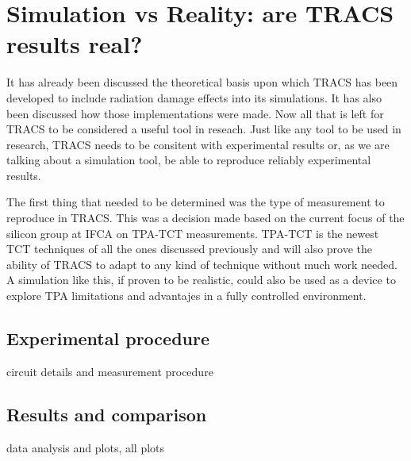 \chapter{Simulation vs Reality: are TRACS results real?}

It has already been discussed the theoretical basis upon which TRACS has been developed to include radiation damage effects into its simulations. It has also been discussed how those implementations were made. Now all that is left for TRACS to be considered a useful tool in reseach. Just like any tool to be used in research, TRACS needs to be consitent with experimental results or, as we are talking about a simulation tool, be able to reproduce reliably experimental results.

The first thing that needed to be determined was the type of measurement to reproduce in TRACS. This was a decision made based on the current focus of the silicon group at IFCA \iffalse No se el nombre oficial \fi on TPA-TCT measurements. TPA-TCT is the newest TCT techniques of all the ones discussed previously and will also prove the ability of TRACS to adapt to any kind of technique without much work needed. A simulation like this, if proven to be realistic, could also be used as a device to explore TPA limitations and advantajes in a fully controlled environment.


\section{Experimental procedure} %
\label{sec:future_improvements}

circuit details and measurement procedure


\section{Results and comparison} %
\label{sec:future_proyection}

data analysis and plots, all plots 


